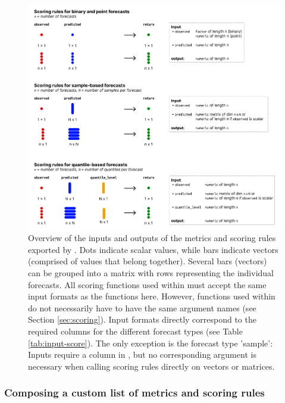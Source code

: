 \documentclass[
]{jss}
\begin{document}
\begin{CodeChunk}
\begin{figure}[!h]

{\centering \includegraphics[width=1\linewidth]{output/input-formats-scoring-rules} 

}

\caption{Overview of the inputs and outputs of the metrics and scoring rules exported by . Dots indicate scalar values, while bars indicate vectors (comprised of values that belong together). Several bars (vectors) can be grouped into a matrix with rows representing the individual forecasts. All scoring functions used within  must accept the same input formats as the functions here. However, functions used within  do not necessarily have to have the same argument names (see Section \ref{sec:scoring}). Input formats directly correspond to the required columns for the different forecast types (see Table \ref{tab:input-score}). The only exception is the forecast type 'sample': Inputs require a column  in , but no corresponding argument is necessary when calling scoring rules directly on vectors or matrices.}\label{fig:input-scoring-rules}
\end{figure}
\end{CodeChunk}

\subsubsection{Composing a custom list of metrics and scoring
rules}\label{composing-a-custom-list-of-metrics-and-scoring-rules}
\end{document}
